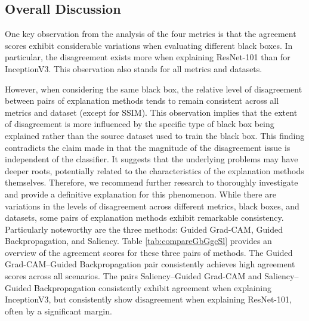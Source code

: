 \subsection{Overall Discussion}
One key observation from the analysis of the four metrics is that the agreement scores exhibit considerable variations when evaluating different black boxes. In particular, the disagreement exists more when explaining ResNet-101 than for InceptionV3. This observation also stands for all metrics and datasets.

However, when considering the same black box, the relative level of disagreement between pairs of explanation methods tends to remain consistent across all metrics and dataset (except for SSIM). This observation implies that the extent of disagreement is more influenced by the specific type of black box being explained rather than the source dataset used to train the black box. This finding contradicts the claim made in \cite{disagreementCounterfactual} that the magnitude of the disagreement issue is independent of the classifier. It suggests that the underlying problems may have deeper roots, potentially related to the characteristics of the explanation methods themselves. Therefore, we recommend further research to thoroughly investigate and provide a definitive explanation for this phenomenon.
While there are variations in the levels of disagreement across different metrics, black boxes, and datasets, some pairs of explanation methods exhibit remarkable consistency. Particularly noteworthy are the three methods: Guided Grad-CAM, Guided Backpropagation, and Saliency. Table \ref{tab:compareGbGgcSl} provides an overview of the agreement scores for these three pairs of methods. The Guided Grad-CAM--Guided Backpropagation pair consistently achieves high agreement scores across all scenarios. The pairs Saliency--Guided Grad-CAM and Saliency--Guided Backpropagation consistently exhibit agreement when explaining InceptionV3, but consistently show disagreement when explaining ResNet-101, often by a significant margin.

